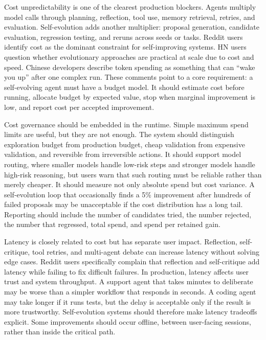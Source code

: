 Cost unpredictability is one of the clearest production blockers. Agents multiply model calls through planning, reflection, tool use, memory retrieval, retries, and evaluation. Self-evolution adds another multiplier: proposal generation, candidate evaluation, regression testing, and reruns across seeds or tasks. Reddit users identify cost as the dominant constraint for self-improving systems. HN users question whether evolutionary approaches are practical at scale due to cost and speed. Chinese developers describe token spending as something that can ``wake you up'' after one complex run. These comments point to a core requirement: a self-evolving agent must have a budget model. It should estimate cost before running, allocate budget by expected value, stop when marginal improvement is low, and report cost per accepted improvement.

Cost governance should be embedded in the runtime. Simple maximum spend limits are useful, but they are not enough. The system should distinguish exploration budget from production budget, cheap validation from expensive validation, and reversible from irreversible actions. It should support model routing, where smaller models handle low-risk steps and stronger models handle high-risk reasoning, but users warn that such routing must be reliable rather than merely cheaper. It should measure not only absolute spend but cost variance. A self-evolution loop that occasionally finds a 5\% improvement after hundreds of failed proposals may be unacceptable if the cost distribution has a long tail. Reporting should include the number of candidates tried, the number rejected, the number that regressed, total spend, and spend per retained gain.

Latency is closely related to cost but has separate user impact. Reflection, self-critique, tool retries, and multi-agent debate can increase latency without solving edge cases. Reddit users specifically complain that reflection and self-critique add latency while failing to fix difficult failures. In production, latency affects user trust and system throughput. A support agent that takes minutes to deliberate may be worse than a simpler workflow that responds in seconds. A coding agent may take longer if it runs tests, but the delay is acceptable only if the result is more trustworthy. Self-evolution systems should therefore make latency tradeoffs explicit. Some improvements should occur offline, between user-facing sessions, rather than inside the critical path.

